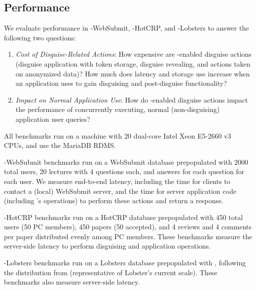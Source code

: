 \subsection{Performance}

We evaluate performance in \sys-WebSubmit, \sys-HotCRP, and \sys-Lobsters to answer the
following two questions:
\begin{enumerate}
\item \emph{Cost of Disguise-Related Actions}: How expensive are \sys-enabled disguise actions
(disguise application with token storage, disguise revealing, and actions taken on anonymized data)?
How much does latency and storage use increase when an application uses \sys to gain disguising and post-disguise functionality?
\item \emph{Impact on Normal Application Use}: How do \sys-enabled disguise actions impact the
    performance of concurrently executing, normal (non-disguising) application user queries?
\end{enumerate}

All benchmarks run on a machine with 20 dual-core Intel Xeon E5-2660 v3 CPUs, and use the MariaDB
RDMS.

\sys-WebSubmit benchmarks run on a WebSubmit database prepopulated with 2000 total users, 20
lectures with 4 questions each, and answers for each question for each user.  We measure end-to-end
latency, including the time for clients to contact a (local) WebSubmit server, and the time for
server application code (including \sys's operations) to perform these actions and return a
response.

\sys-HotCRP benchmarks run on a HotCRP database prepopulated with 450 total users (50 PC members),
450 papers (50 accepted), and 4 reviews and 4 comments per paper distributed evenly among PC
members. These benchmarks measure the server-side latency to perform disguising and application
operations.

\sys-Lobsters benchmarks run on a Lobsters database prepopulated with , following the
distribution from  (representative of Lobster's current scale).
These benchmarks also measure server-side latency.

